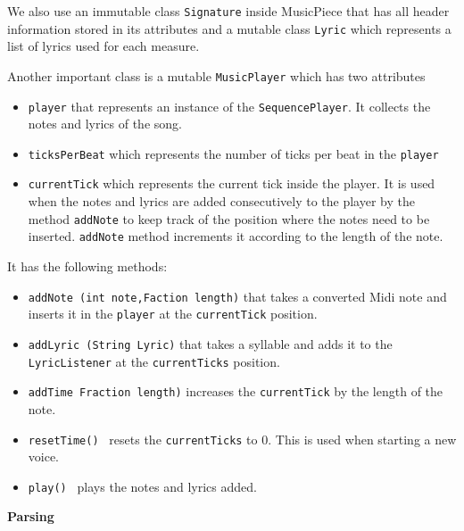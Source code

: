 \documentclass[12pt]{book}
\begin{document}
We also use an immutable class {\tt Signature} inside MusicPiece that has all header information stored in its attributes and a mutable class {\tt Lyric} which represents a list of lyrics used for each measure.

\bigskip
Another important class is a mutable {\tt MusicPlayer} which has two attributes 
\begin{itemize} 
\item { \tt player} that represents an instance of the {\tt SequencePlayer}. It collects the notes and lyrics of the song.
\item { \tt ticksPerBeat} which represents the number of ticks per beat in the {\tt player}
\item { \tt currentTick} which represents the current tick inside the player. It is used when the notes and lyrics are added consecutively to the player by the method {\tt addNote} to keep track of the position  where the notes need to be inserted. {\tt addNote} method increments it according to the length of the note.
\end{itemize}
It has the following methods:
\begin{itemize} 
\item { \tt addNote (int note,Faction length)} that takes a converted Midi note and inserts it in the {\tt player} at the {\tt currentTick} position.
\item { \tt addLyric (String Lyric)} that takes a syllable and adds it to the {\tt LyricListener} at the {\tt currentTicks} position.
\item { \tt addTime Fraction length)} increases the {\tt currentTick} by the length of the note.
\item { \tt resetTime() } resets the {\tt currentTicks} to 0. This is used when starting a new voice.
\item { \tt play() } plays the notes and lyrics added.
\end{itemize}


\centerline{{\large \bf Parsing }}
\end{document}
